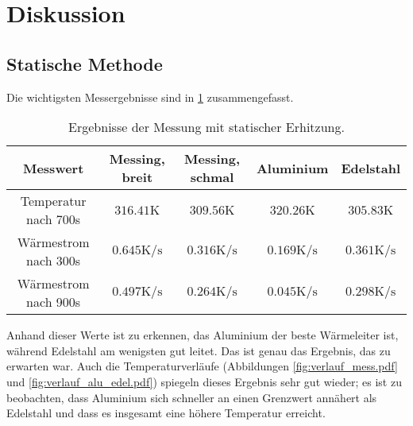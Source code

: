 \section{Diskussion}
\label{sec:Diskussion}

\subsection{Statische Methode}
Die wichtigsten Messergebnisse sind in \ref{tab:pieceofshit} zusammengefasst.

\begin{table}
    \centering
    \caption{Ergebnisse der Messung mit statischer Erhitzung.}
    \label{tab:pieceofshit}
    \begin{tabular}{c c c c c}
        \toprule
        Messwert & Messing, breit & Messing, schmal & Aluminium & Edelstahl \\
        \midrule
        Temperatur nach 700s & $316.41 \si{\kelvin}$  & $309.56 \si{\kelvin} $ & $320.26 \si{\kelvin}$ & $305.83 \si{\kelvin}$\\
        Wärmestrom nach 300s & $0.645 \si{\kelvin\per\s}$ & $0.316 \si{\kelvin\per\s}$ & $0.169 \si{\kelvin\per\s}$ & $0.361 \si{\kelvin\per\s}$\\
        Wärmestrom nach 900s & $0.497 \si{\kelvin\per\s}$ & $0.264 \si{\kelvin\per\s}$ & $0.045 \si{\kelvin\per\s}$ & $0.298 \si{\kelvin\per\s}$\\
        \bottomrule
    \end{tabular}
\end{table}%

\noindent Anhand dieser Werte ist zu erkennen, das Aluminium der beste Wärmeleiter ist, während Edelstahl am wenigsten gut leitet. Das ist genau das Ergebnis, das zu erwarten war.
Auch die Temperaturverläufe (Abbildungen \ref{fig:verlauf_mess.pdf} und \ref{fig:verlauf_alu_edel.pdf}) 
spiegeln dieses Ergebnis sehr gut wieder; es ist zu beobachten, dass Aluminium sich schneller an einen Grenzwert annähert als Edelstahl und dass es 
insgesamt eine höhere Temperatur erreicht. 

